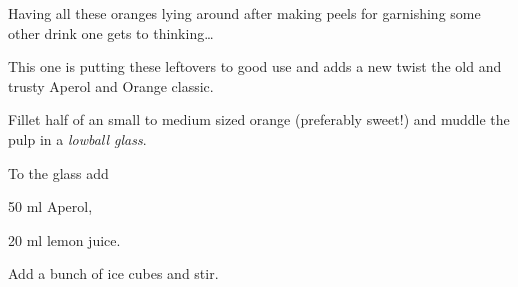 \startsection[title={Pulp Aperol},reference=pulpaperol]
Having all these oranges lying around after making peels for garnishing
some other drink one gets to thinking\dots

This one is putting these leftovers to good use and adds a new twist the
old and trusty Aperol and Orange classic.

\startitemize
\item Fillet half of an \tr small to medium sized orange (preferably
      sweet!) and muddle the pulp in a {\em lowball glass}.
\item To the glass add
      \startitemize
      \item 50 ml Aperol,
      \item 20 ml lemon juice.
      \stopitemize
\item Add a bunch of ice cubes and stir.
\stopitemize
